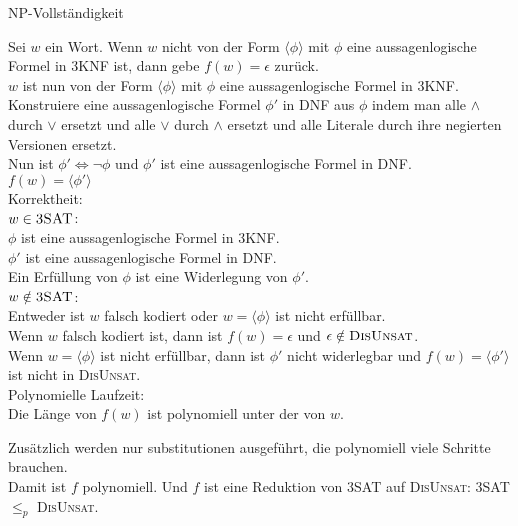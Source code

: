 \documentclass[answers]{submit}
\begin{document}
\begin{exercise}[3]{NP-Vollständigkeit}
{    Sei $w$ ein Wort. Wenn $w$ nicht von der Form $\langle \phi \rangle$ mit $\phi$ eine aussagenlogische Formel in 3KNF ist, dann gebe $f(w) = \epsilon$ zurück.\\

    $w$ ist nun von der Form $\langle \phi \rangle$ mit $\phi$ eine aussagenlogische Formel in 3KNF.\\

    Konstruiere eine aussagenlogische Formel $\phi'$ in DNF aus $\phi$ indem man alle $\land$ durch $\lor$ ersetzt und alle $\lor$ durch $\land$ ersetzt
    und alle Literale durch ihre negierten Versionen ersetzt.\\

    Nun ist $\phi'\iff \neg \phi$ und $\phi'$ ist eine aussagenlogische Formel in DNF.\\

    $f(w) = \langle \phi' \rangle$\\

    Korrektheit:\\

    $w \in \textsc{3SAT}$:\\

    $\phi$ ist eine aussagenlogische Formel in 3KNF.\\

    $\phi'$ ist eine aussagenlogische Formel in DNF.\\

    Ein Erfüllung von $\phi$ ist eine Widerlegung von $\phi'$.\\

    $w \notin \textsc{3SAT}$:\\

    Entweder ist $w$ falsch kodiert oder $w=\langle\phi\rangle$ ist nicht erfüllbar.\\

    Wenn $w$ falsch kodiert ist, dann ist $f(w) = \epsilon$ und $\epsilon \notin \textsc{DisUnsat}$.\\

    Wenn $w=\langle\phi\rangle$ ist nicht erfüllbar, dann ist $\phi'$ nicht widerlegbar und $f(w) = \langle \phi' \rangle$ ist nicht in \textsc{DisUnsat}.\\

    Polynomielle Laufzeit:\\

    Die Länge von $f(w)$ ist polynomiell unter der von $w$.

    Zusätzlich werden nur substitutionen ausgeführt, die polynomiell viele Schritte brauchen.\\

    Damit ist $f$ polynomiell. Und $f$ ist eine Reduktion von \textsc{3SAT} auf \textsc{DisUnsat}: \textsc{3SAT} $\leq_p$ \textsc{DisUnsat}.\\

  }
\end{exercise}
\end{document}
